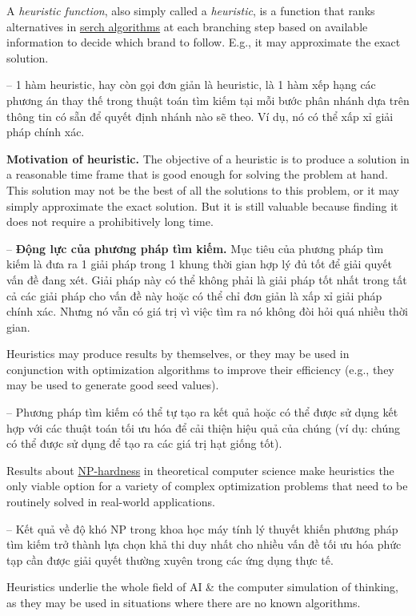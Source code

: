 \documentclass{article}
\begin{document}
A {\it heuristic function}, also simply called a {\it heuristic}, is a function that ranks alternatives in \href{https://en.wikipedia.org/wiki/Search_algorithm}{serch algorithms} at each branching step based on available information to decide which brand to follow. E.g., it may approximate the exact solution.

-- 1 hàm heuristic, hay còn gọi đơn giản là heuristic, là 1 hàm xếp hạng các phương án thay thế trong thuật toán tìm kiếm tại mỗi bước phân nhánh dựa trên thông tin có sẵn để quyết định nhánh nào sẽ theo. Ví dụ, nó có thể xấp xỉ giải pháp chính xác.

{\bf Motivation of heuristic.} The objective of a heuristic is to produce a solution in a reasonable time frame that is good enough for solving the problem at hand. This solution may not be the best of all the solutions to this problem, or it may simply approximate the exact solution. But it is still valuable because finding it does not require a prohibitively long time.

-- {\bf Động lực của phương pháp tìm kiếm.} Mục tiêu của phương pháp tìm kiếm là đưa ra 1 giải pháp trong 1 khung thời gian hợp lý đủ tốt để giải quyết vấn đề đang xét. Giải pháp này có thể không phải là giải pháp tốt nhất trong tất cả các giải pháp cho vấn đề này hoặc có thể chỉ đơn giản là xấp xỉ giải pháp chính xác. Nhưng nó vẫn có giá trị vì việc tìm ra nó không đòi hỏi quá nhiều thời gian.

Heuristics may produce results by themselves, or they may be used in conjunction with optimization algorithms to improve their efficiency (e.g., they may be used to generate good seed values).

-- Phương pháp tìm kiếm có thể tự tạo ra kết quả hoặc có thể được sử dụng kết hợp với các thuật toán tối ưu hóa để cải thiện hiệu quả của chúng (ví dụ: chúng có thể được sử dụng để tạo ra các giá trị hạt giống tốt).

Results about \href{https://en.wikipedia.org/wiki/NP-hard}{NP-hardness} in theoretical computer science make heuristics the only viable option for a variety of complex optimization problems that need to be routinely solved in real-world applications.

-- Kết quả về độ khó NP trong khoa học máy tính lý thuyết khiến phương pháp tìm kiếm trở thành lựa chọn khả thi duy nhất cho nhiều vấn đề tối ưu hóa phức tạp cần được giải quyết thường xuyên trong các ứng dụng thực tế.

Heuristics underlie the whole field of AI \& the computer simulation of thinking, as they may be used in situations where there are no known algorithms.
\end{document}
